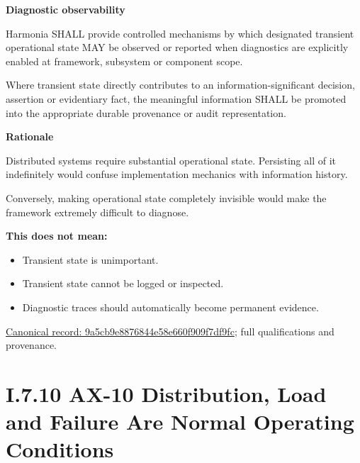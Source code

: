 \par\medskip\textbf{Diagnostic observability}\par


Harmonia SHALL provide controlled mechanisms by which designated
transient operational state MAY be observed or reported when diagnostics
are explicitly enabled at framework, subsystem or component scope.



Where transient state directly contributes to an information-significant
decision, assertion or evidentiary fact, the meaningful information
SHALL be promoted into the appropriate durable provenance or audit
representation.



\par\medskip\textbf{Rationale}\par


Distributed systems require substantial operational state. Persisting
all of it indefinitely would confuse implementation mechanics with
information history.



Conversely, making operational state completely invisible would make the
framework extremely difficult to diagnose.



\textbf{This does not mean:}



\begin{itemize}


\item Transient state is unimportant.

\item Transient state cannot be logged or inspected.

\item Diagnostic traces should automatically become permanent evidence.

\end{itemize}

{\footnotesize \href{../../../../continuum/motivation/principle/9a5cb9e8876844e58e660f909f7df9fc.md}{Canonical record: 9a5cb9e8876844e58e660f909f7df9fc}; full qualifications and provenance.}\par
\section*{I.7.10 AX-10 Distribution, Load and Failure Are Normal Operating Conditions}
\label{navigation:I.7.10}

